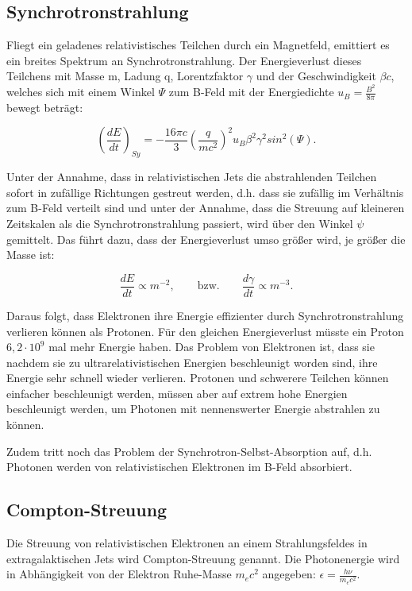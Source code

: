 \subsection{Synchrotronstrahlung}
Fliegt ein geladenes relativistisches Teilchen durch ein Magnetfeld, emittiert es ein breites Spektrum an Synchrotronstrahlung.
Der Energieverlust dieses Teilchens mit Masse m, Ladung q, Lorentzfaktor $\gamma$ und der Geschwindigkeit $\beta c$, welches sich mit einem Winkel $\Psi$ zum B-Feld mit der Energiedichte $u_B=\frac{B^2}{8\pi}$ bewegt beträgt:

\begin{equation}
 \left( \frac{dE}{dt} \right)_{Sy} = - \frac{16 \pi c}{3} \left(\frac{q}{mc^2} \right)^2 u_B \beta^2 \gamma^2 sin^2(\Psi).
\end{equation}

Unter der Annahme, dass in relativistischen Jets die abstrahlenden Teilchen sofort in zufällige Richtungen gestreut werden, d.h. dass sie zufällig im Verhältnis zum B-Feld verteilt sind und unter der Annahme, dass die Streuung auf kleineren Zeitskalen als die Synchrotronstrahlung passiert, wird über den Winkel $\psi$ gemittelt.
Das führt dazu, dass der Energieverlust umso größer wird, je größer die Masse ist:

\begin{equation}
 \frac{dE}{dt}\propto m^{-2}, \qquad \text{bzw.} \qquad \frac{d\gamma}{dt}\propto m^{-3}.
\end{equation}

Daraus folgt, dass Elektronen ihre Energie effizienter durch Synchrotronstrahlung verlieren können als Protonen.
Für den gleichen Energieverlust müsste ein Proton $6,2 \cdot 10^9$ mal mehr Energie haben.
Das Problem von Elektronen ist, dass sie nachdem sie zu ultrarelativistischen Energien beschleunigt worden sind, ihre Energie sehr schnell wieder verlieren.
Protonen und schwerere Teilchen können einfacher beschleunigt werden,  müssen aber auf extrem hohe Energien beschleunigt werden, um Photonen mit nennenswerter Energie abstrahlen zu können.

Zudem tritt noch das Problem der Synchrotron-Selbst-Absorption auf, d.h. Photonen werden von relativistischen Elektronen im B-Feld absorbiert.\cite{RelativisticJets}

\subsection{Compton-Streuung}
Die Streuung von relativistischen Elektronen an einem Strahlungsfeldes in extragalaktischen Jets wird Compton-Streuung genannt.
Die Photonenergie wird in Abhängigkeit von der Elektron Ruhe-Masse $m_e c^2$ angegeben: $\epsilon= \frac{h\nu}{m_e c^2}$.\cite{RelativisticJets}
 
